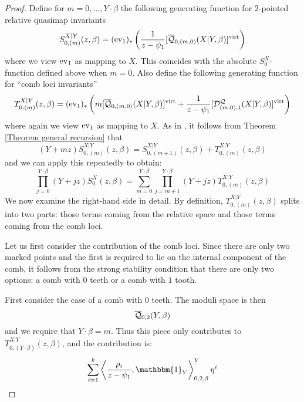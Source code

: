 \begin{proof}
Define for $m = 0, \ldots, Y \cdot \beta$ the following generating function for $2$-pointed relative quasimap invariants
 \[
  S_{0,(m)}^{X|Y}(z,\beta)=(\operatorname{ev}_1)_*\left(\frac{1}{z-\psi_1}[\overline{\mathcal Q}_{0,(m,0)}(X|Y,\beta)]^{\operatorname{virt}}\right)
 \]
where we view $\operatorname{ev}_1$ as mapping to $X$. This coincides with the absolute $S_0^X$-function defined above when $m=0$. Also define the following generating function for ``comb loci invariants''
\[
 T_{0,(m)}^{X|Y}(z,\beta)=(\operatorname{ev}_1)_*\left(m [\overline{\mathcal Q}_{0,(m,0)}(X|Y,\beta)]^{\operatorname{virt}}+\frac{1}{z-\psi_1} [\mathcal{D}^{\mathcal{Q}}_{(m,0),1}(X|Y,\beta)]^{\operatorname{virt}} \right)
\]
where again we view $\operatorname{ev}_1$ as mapping to $X$. As in \cite[Lemma 1.2]{Ga-MF}, it follows from Theorem \ref{Theorem general recursion} that
\begin{equation}\label{eqn:G}
 (Y+mz) S_{0,(m)}^{X|Y}(z,\beta) = S_{0,(m+1)}^{X|Y}(z,\beta)+ T_{0,(m)}^{X|Y}(z,\beta)
\end{equation}
and we can apply this repeatedly to obtain:
\[
 \prod_{j=0}^{Y\cdot\beta}(Y+jz) S_0^X(z,\beta) = \sum_{m=0}^{Y\cdot\beta}\prod_{j=m+1}^{Y\cdot\beta}(Y+jz)T_{0,(m)}^{X|Y}(z,\beta)
\]
We now examine the right-hand side in detail. By definition, $T_{0,(m)}^{X|Y}(z,\beta)$ splits into two parts: those terms coming from the relative space and those terms coming from the comb loci.

Let us first consider the contribution of the comb loci. Since there are only two marked points and the first is required to lie on the internal component of the comb, it follows from the strong stability condition that there are only two options: a comb with $0$ teeth or a comb with $1$ tooth.

First consider the case of a comb with $0$ teeth. The moduli space is then
\begin{equation*} \overline{\mathcal Q}_{0,2}(Y,\beta) \end{equation*}
and we require that $Y \cdot \beta = m$. Thus this piece only contributes to $T_{0,(Y\cdot\beta)}^{X|Y}(z,\beta)$, and the contribution is:
\begin{equation*} \sum_{i=1}^k \left\langle \dfrac{\rho_i}{z-\psi_1}, \mathbbm{1}_Y \right\rangle_{0,2,\beta}^Y \eta^i \end{equation*}


\end{proof}
